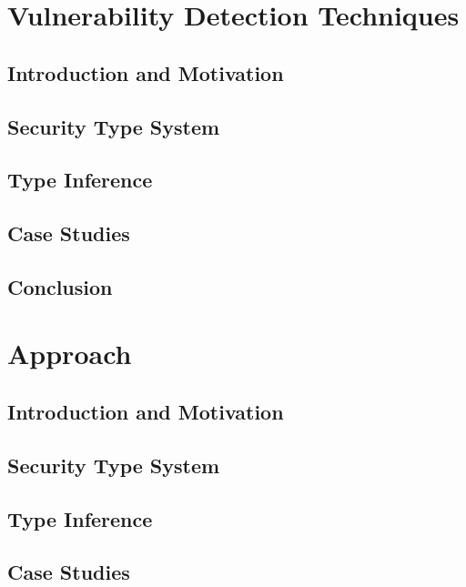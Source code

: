 \documentclass[12pt, a4paper, oneside]{Thesis}
\begin{document}
\chapter{Vulnerability Detection Techniques} \label{Chapter4}

\section{Introduction and Motivation}

\section{Security Type System}


\section{Type Inference}

\section{Case Studies}

\section{Conclusion}
 
\fancyhead[RE,LO]{\fancyplain{}{\leftmark}}
\renewcommand{\chaptermark}[1]{\markboth{\chaptername\ \thechapter.\ \emph{Security Type Checking for Android Access Control}}{}}


\chapter{Approach} \label{Chapter4}

\section{Introduction and Motivation}

\section{Security Type System}


\section{Type Inference}

\section{Case Studies}
\end{document}
